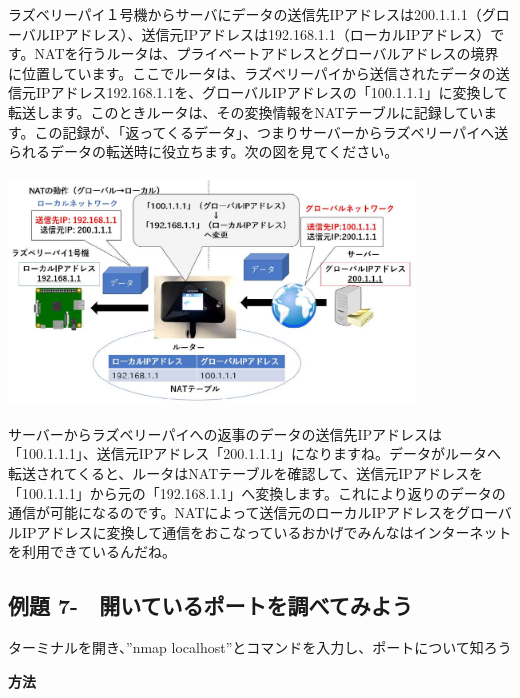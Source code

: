 \documentclass[a4paper,12pt,dvipdfmx]{jarticle}
\newcounter{Exercise}
\renewcommand\theExercise{例題 7-\arabic{Exercise}}
\begin{document}
\bigskip



ラズベリーパイ１号機からサーバにデータの送信先IPアドレスは200.1.1.1（グローバルIPアドレス）、送信元IPアドレスは192.168.1.1（ローカルIPアドレス）です。NATを行うルータは、プライベートアドレスとグローバルアドレスの境界に位置しています。ここでルータは、ラズベリーパイから送信されたデータの送信元IPアドレス192.168.1.1を、グローバルIPアドレスの「100.1.1.1」に変換して転送します。このときルータは、その変換情報をNATテーブルに記録しています。この記録が、「返ってくるデータ」、つまりサーバーからラズベリーパイへ送られるデータの転送時に役立ちます。次の図を見てください。



\centering
\includegraphics[width=10.83cm,height=6.096cm]{ome7-img030}
\flushleft



\bigskip

サーバーからラズベリーパイへの返事のデータの送信先IPアドレスは「100.1.1.1」、送信元IPアドレス「200.1.1.1」になりますね。データがルータへ転送されてくると、ルータはNATテーブルを確認して、送信元IPアドレスを「100.1.1.1」から元の「192.168.1.1」へ変換します。これにより返りのデータの通信が可能になるのです。NATによって送信元のローカルIPアドレスをグローバルIPアドレスに変換して通信をおこなっているおかげでみんなはインターネットを利用できているんだね。


\bigskip


\bigskip

\clearpage\subsection*{\theExercise　開いているポートを調べてみよう}
ターミナルを開き、”nmap
localhost”とコマンドを入力し、ポートについて知ろう

{\bfseries
方法}
\end{document}

